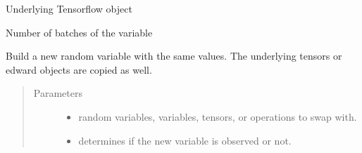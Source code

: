 \documentclass[letterpaper,10pt,english]{sphinxmanual}
\begin{document}
\begin{fulllineitems}
\begin{fulllineitems}
\label{\detokenize{modules/inferpy.models:inferpy.models.random_variable.RandomVariable.base_object}}
Underlying Tensorflow object

\end{fulllineitems}


\begin{fulllineitems}
\label{\detokenize{modules/inferpy.models:inferpy.models.random_variable.RandomVariable.batches}}
Number of batches of the variable

\end{fulllineitems}


\begin{fulllineitems}
\label{\detokenize{modules/inferpy.models:inferpy.models.random_variable.RandomVariable.bind}}
\end{fulllineitems}


\begin{fulllineitems}
\label{\detokenize{modules/inferpy.models:inferpy.models.random_variable.RandomVariable.copy}}
Build a new random variable with the same values.
The underlying tensors or edward objects are copied as well.
\begin{quote}\begin{description}
\item[{Parameters}] \leavevmode\begin{itemize}
\item {} 
 \textendash{} random variables, variables, tensors, or operations to swap with.

\item {} 
 \textendash{} determines if the new variable is observed or not.

\end{itemize}

\end{description}\end{quote}


\end{fulllineitems}
\end{fulllineitems}
\end{document}

